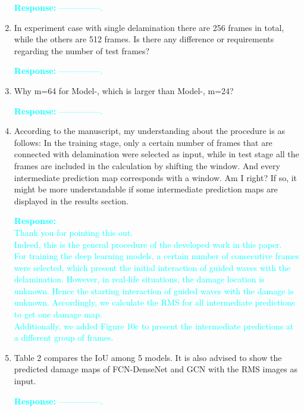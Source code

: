 \documentclass[11pt,a2paper]{report}
\newcommand{\RNum}[1]{\uppercase\expandafter{\romannumeral #1\relax}}
\begin{document}
\begin{enumerate}
	\textcolor{Cyan}{
		\textbf{Response:}
		---------------.
	}	

	\item In experiment case with single delamination there are 256 frames in 
	total, while the others are 512 frames.
	Is there any difference or requirements regarding the number of test frames?

\textcolor{Cyan}{
	\textbf{Response:}
	---------------.
}

	\item Why m=64 for Model-\RNum{1}, which is larger than Model-\RNum{2}, 
	m=24?

\textcolor{Cyan}{
	\textbf{Response:}
	---------------.
}

	\item According to the manuscript, my understanding about the procedure is 
	as follows: In the training stage, only a certain number of frames that are 
	connected with delamination were selected as input, while in test stage all 
	the frames are included in the calculation by shifting the window.
	And every intermediate prediction map corresponds with a window. 
	Am I right? If so, it might be more understandable if some intermediate 
	prediction maps are displayed in the results section.

\textcolor{Cyan}{
	\textbf{Response:} \\
	Thank you for pointing this out. \\
	Indeed, this is the general procedure of the developed work in this paper.\\
	For training the deep learning models, a certain number of consecutive frames were selected, which present the initial interaction of guided waves with the delamination.
	However, in real-life situations, the damage location is unknown.
	Hence the starting interaction of guided waves with the damage is unknown.
	Accordingly, we calculate the RMS for all intermediate predictions to get one damage map. \\
	Additionally, we added Figure 10c to present the intermediate predictions at a different group of frames.
}

	\item Table 2 compares the IoU among 5 models. It is also advised to show 
	the predicted damage maps of FCN-DenseNet and GCN with the RMS images as 
	input.

\textcolor{Cyan}{
	\textbf{Response:}
	---------------.
}

\end{enumerate}	
\end{document}
